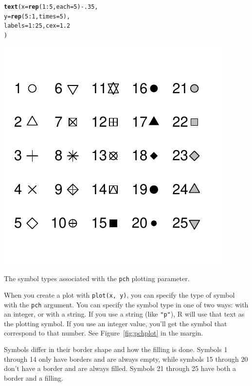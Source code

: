 \documentclass{tufte-book}\usepackage[]{graphicx}\usepackage[]{color}
\makeatletter
\def\maxwidth{ %
  \ifdim\Gin@nat@width>\linewidth
    \linewidth
  \else
    \Gin@nat@width
  \fi
}
\newcommand{\hlnum}[1]{\textcolor[rgb]{0.686,0.059,0.569}{#1}}%
\newcommand{\hlopt}[1]{\textcolor[rgb]{0,0,0}{#1}}%
\newcommand{\hlstd}[1]{\textcolor[rgb]{0.345,0.345,0.345}{#1}}%
\newcommand{\hlkwc}[1]{\textcolor[rgb]{0.333,0.667,0.333}{#1}}%
\newcommand{\hlkwd}[1]{\textcolor[rgb]{0.737,0.353,0.396}{\textbf{#1}}}%
\newenvironment{kframe}{%
 \def\at@end@of@kframe{}%
 \ifinner\ifhmode%
  \def\at@end@of@kframe{\end{minipage}}%
  \begin{minipage}{\columnwidth}%
 \fi\fi%
 \def\FrameCommand##1{\hskip\@totalleftmargin \hskip-\fboxsep
 \colorbox{shadecolor}{##1}\hskip-\fboxsep
     \hskip-\linewidth \hskip-\@totalleftmargin \hskip\columnwidth}%
 \MakeFramed {\advance\hsize-\width
   \@totalleftmargin\z@ \linewidth\hsize
   \@setminipage}}%
 {\par\unskip\endMakeFramed%
 \at@end@of@kframe}
\newenvironment{knitrout}{}{} %
\makeatother
\begin{document}
\begin{marginfigure}
\begin{tiny}
\begin{knitrout}
\begin{kframe}
\begin{alltt}
\hlkwd{text}\hlstd{(}\hlkwc{x} \hlstd{=} \hlkwd{rep}\hlstd{(}\hlnum{1}\hlopt{:}\hlnum{5}\hlstd{,} \hlkwc{each} \hlstd{=} \hlnum{5}\hlstd{)} \hlopt{-} \hlnum{.35}\hlstd{,}
     \hlkwc{y} \hlstd{=} \hlkwd{rep}\hlstd{(}\hlnum{5}\hlopt{:}\hlnum{1}\hlstd{,} \hlkwc{times} \hlstd{=} \hlnum{5}\hlstd{),}
     \hlkwc{labels} \hlstd{=} \hlnum{1}\hlopt{:}\hlnum{25}\hlstd{,} \hlkwc{cex} \hlstd{=} \hlnum{1.2}
     \hlstd{)}
\end{alltt}
\end{kframe}
\includegraphics[width=\maxwidth]{figure/unnamed-chunk-194-1} 

\end{knitrout}
\end{tiny}
\caption{The symbol types associated with the \texttt{pch} plotting parameter.}
\label{fig:pchplot}
\end{marginfigure}


When you create a plot with \texttt{plot(x, y)}, you can specify the type of symbol with the \texttt{pch} argument. You can specify the symbol type in one of two ways: with an integer, or with a string. If you use a string (like \texttt{"p"}), R will use that text as the plotting symbol. If you use an integer value, you'll get the symbol that correspond to that number. See Figure~\ref{fig:pchplot} in the margin.

Symbols differ in their border shape and how the filling is done. Symbols 1 through 14 only have borders and are always empty, while symbols 15 through 20 don't have a border and are always filled. Symbols 21 through 25 have both a border and a filling.
\end{document}
